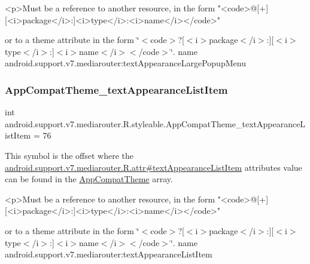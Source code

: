\begin{DoxyVerb}      <p>Must be a reference to another resource, in the form "<code>@[+][<i>package</i>:]<i>type</i>:<i>name</i></code>"
\end{DoxyVerb}
 or to a theme attribute in the form \char`\"{}$<$code$>$?\mbox{[}$<$i$>$package$<$/i$>$\+:\mbox{]}\mbox{[}$<$i$>$type$<$/i$>$\+:\mbox{]}$<$i$>$name$<$/i$>$$<$/code$>$\char`\"{}.  name android.\+support.\+v7.\+mediarouter\+:text\+Appearance\+Large\+Popup\+Menu \mbox{\label{classandroid_1_1support_1_1v7_1_1mediarouter_1_1R_1_1styleable_ae585f2ef6f2ff59cc4f7be52f5ce8f26}} 
\subsubsection{\texorpdfstring{App\+Compat\+Theme\+\_\+text\+Appearance\+List\+Item}{AppCompatTheme\_textAppearanceListItem}}
{\footnotesize\ttfamily int android.\+support.\+v7.\+mediarouter.\+R.\+styleable.\+App\+Compat\+Theme\+\_\+text\+Appearance\+List\+Item = 76\hspace{0.3cm}{\ttfamily [static]}}

This symbol is the offset where the \hyperlink{classandroid_1_1support_1_1v7_1_1mediarouter_1_1R_1_1attr_a4baedae190dea72517bc95b649f9703f}{android.\+support.\+v7.\+mediarouter.\+R.\+attr\#text\+Appearance\+List\+Item} attribute\textquotesingle{}s value can be found in the \hyperlink{classandroid_1_1support_1_1v7_1_1mediarouter_1_1R_1_1styleable_a4e3d3900c75d49aeb2f283cac00214d6}{App\+Compat\+Theme} array.

\begin{DoxyVerb}      <p>Must be a reference to another resource, in the form "<code>@[+][<i>package</i>:]<i>type</i>:<i>name</i></code>"
\end{DoxyVerb}
 or to a theme attribute in the form \char`\"{}$<$code$>$?\mbox{[}$<$i$>$package$<$/i$>$\+:\mbox{]}\mbox{[}$<$i$>$type$<$/i$>$\+:\mbox{]}$<$i$>$name$<$/i$>$$<$/code$>$\char`\"{}.  name android.\+support.\+v7.\+mediarouter\+:text\+Appearance\+List\+Item \mbox{\label{classandroid_1_1support_1_1v7_1_1mediarouter_1_1R_1_1styleable_abfe06fe93e65f2145a7481cd483217d0}} 
